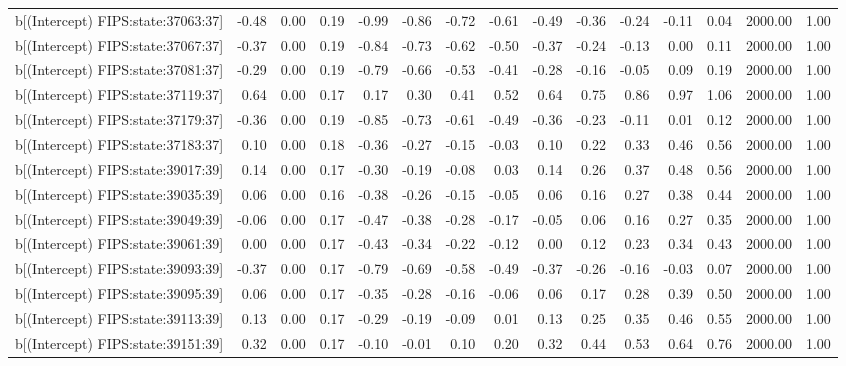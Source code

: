 \begin{table}[ht]
\begin{tabular}{rrrrrrrrrrrrrrr}
  b[(Intercept) FIPS:state:37063:37] & -0.48 & 0.00 & 0.19 & -0.99 & -0.86 & -0.72 & -0.61 & -0.49 & -0.36 & -0.24 & -0.11 & 0.04 & 2000.00 & 1.00 \\ 
  b[(Intercept) FIPS:state:37067:37] & -0.37 & 0.00 & 0.19 & -0.84 & -0.73 & -0.62 & -0.50 & -0.37 & -0.24 & -0.13 & 0.00 & 0.11 & 2000.00 & 1.00 \\ 
  b[(Intercept) FIPS:state:37081:37] & -0.29 & 0.00 & 0.19 & -0.79 & -0.66 & -0.53 & -0.41 & -0.28 & -0.16 & -0.05 & 0.09 & 0.19 & 2000.00 & 1.00 \\ 
  b[(Intercept) FIPS:state:37119:37] & 0.64 & 0.00 & 0.17 & 0.17 & 0.30 & 0.41 & 0.52 & 0.64 & 0.75 & 0.86 & 0.97 & 1.06 & 2000.00 & 1.00 \\ 
  b[(Intercept) FIPS:state:37179:37] & -0.36 & 0.00 & 0.19 & -0.85 & -0.73 & -0.61 & -0.49 & -0.36 & -0.23 & -0.11 & 0.01 & 0.12 & 2000.00 & 1.00 \\ 
  b[(Intercept) FIPS:state:37183:37] & 0.10 & 0.00 & 0.18 & -0.36 & -0.27 & -0.15 & -0.03 & 0.10 & 0.22 & 0.33 & 0.46 & 0.56 & 2000.00 & 1.00 \\ 
  b[(Intercept) FIPS:state:39017:39] & 0.14 & 0.00 & 0.17 & -0.30 & -0.19 & -0.08 & 0.03 & 0.14 & 0.26 & 0.37 & 0.48 & 0.56 & 2000.00 & 1.00 \\ 
  b[(Intercept) FIPS:state:39035:39] & 0.06 & 0.00 & 0.16 & -0.38 & -0.26 & -0.15 & -0.05 & 0.06 & 0.16 & 0.27 & 0.38 & 0.44 & 2000.00 & 1.00 \\ 
  b[(Intercept) FIPS:state:39049:39] & -0.06 & 0.00 & 0.17 & -0.47 & -0.38 & -0.28 & -0.17 & -0.05 & 0.06 & 0.16 & 0.27 & 0.35 & 2000.00 & 1.00 \\ 
  b[(Intercept) FIPS:state:39061:39] & 0.00 & 0.00 & 0.17 & -0.43 & -0.34 & -0.22 & -0.12 & 0.00 & 0.12 & 0.23 & 0.34 & 0.43 & 2000.00 & 1.00 \\ 
  b[(Intercept) FIPS:state:39093:39] & -0.37 & 0.00 & 0.17 & -0.79 & -0.69 & -0.58 & -0.49 & -0.37 & -0.26 & -0.16 & -0.03 & 0.07 & 2000.00 & 1.00 \\ 
  b[(Intercept) FIPS:state:39095:39] & 0.06 & 0.00 & 0.17 & -0.35 & -0.28 & -0.16 & -0.06 & 0.06 & 0.17 & 0.28 & 0.39 & 0.50 & 2000.00 & 1.00 \\ 
  b[(Intercept) FIPS:state:39113:39] & 0.13 & 0.00 & 0.17 & -0.29 & -0.19 & -0.09 & 0.01 & 0.13 & 0.25 & 0.35 & 0.46 & 0.55 & 2000.00 & 1.00 \\ 
  b[(Intercept) FIPS:state:39151:39] & 0.32 & 0.00 & 0.17 & -0.10 & -0.01 & 0.10 & 0.20 & 0.32 & 0.44 & 0.53 & 0.64 & 0.76 & 2000.00 & 1.00 \\ 

\end{tabular}
\end{table}
